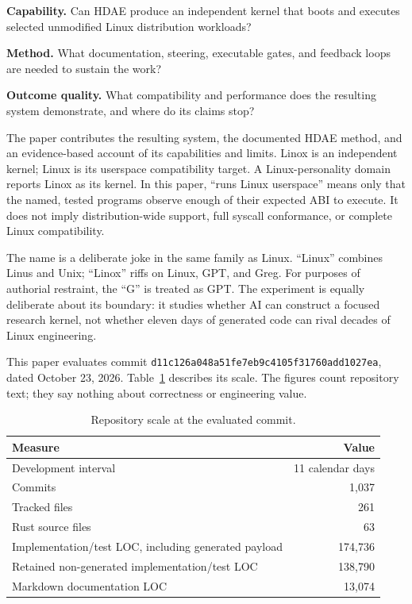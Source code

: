 \documentclass[11pt]{article}
\newcommand{\evaluatedcommit}{\texttt{d11c126a048a\allowbreak{}51fe7eb9c410\allowbreak{}5f31760add10\allowbreak{}27ea}}
\begin{document}
\begin{description}[
  style=multiline,
  leftmargin=0.82in,
  labelwidth=0.62in,
  labelsep=0.20in,
  itemsep=0.45em,
  topsep=0.45em
]
\item[\textbf{RQ1}] \textbf{Capability.} Can HDAE produce an independent kernel
  that boots and executes selected unmodified Linux distribution workloads?
\item[\textbf{RQ2}] \textbf{Method.} What documentation, steering, executable
  gates, and feedback loops are needed to sustain the work?
\item[\textbf{RQ3}] \textbf{Outcome quality.} What compatibility and performance
  does the resulting system demonstrate, and where do its claims stop?
\end{description}

The paper contributes the resulting system, the documented HDAE method,
and an evidence-based account of its capabilities and limits. Linox is
an independent kernel; Linux is its userspace compatibility target. A
Linux-personality domain reports Linox as its kernel. In this paper,
``runs Linux userspace'' means only that the named, tested programs observe
enough of their expected ABI to execute. It does not imply distribution-wide
support, full syscall conformance, or complete Linux compatibility.

The name is a deliberate joke in the same family as Linux. ``Linux'' combines
Linus and Unix; ``Linox'' riffs on Linux, GPT, and Greg. For purposes of
authorial restraint, the ``G'' is treated as GPT. The experiment is equally
deliberate about its boundary: it studies whether AI can construct a focused
research kernel, not whether eleven days of generated code can rival decades of
Linux engineering.

This paper evaluates commit \evaluatedcommit{}, dated October 23, 2026.
Table~\ref{tab:scale} describes its scale. The figures count repository text;
they say nothing about correctness or engineering value.

\begin{table}[ht]
\centering
\begin{tabular}{lr}
\toprule
Measure & Value \\
\midrule
Development interval & 11 calendar days \\
Commits & 1,037 \\
Tracked files & 261 \\
Rust source files & 63 \\
Implementation/test LOC, including generated payload & 174,736 \\
Retained non-generated implementation/test LOC & 138,790 \\
Markdown documentation LOC & 13,074 \\
\bottomrule
\end{tabular}
\caption{Repository scale at the evaluated commit.}
\label{tab:scale}
\end{table}
\end{document}
